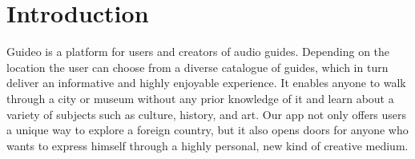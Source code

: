 \documentclass[12pt]{article}
\theoremstyle{definition}
\newenvironment{text}{
}{}
\begin{document}
\section{Introduction}
\begin{text}
Guideo is a platform for users and creators of audio guides. Depending on the location the user can choose from a diverse catalogue of guides, which in turn deliver an informative and highly enjoyable experience. 
It enables anyone to walk through a city or museum without any prior knowledge of it and learn about a variety of subjects such as culture, history, and art. 
Our app not only offers users a unique way to explore a foreign country, but it also opens doors for anyone who wants to express himself through a highly personal, new kind of creative medium. 
 
\end{text}
\pagebreak
 
\end{document}
